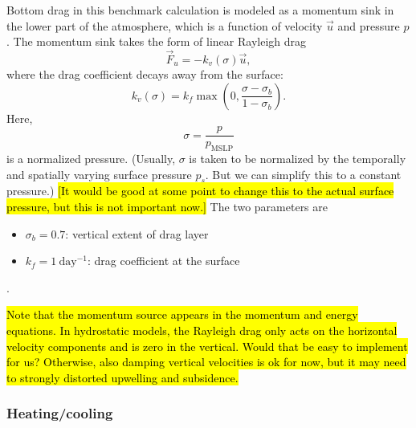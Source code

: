 \documentclass{report}
\begin{document}
{Bottom drag in this benchmark calculation is modeled as a momentum sink in the lower part of the atmosphere, which is a function of velocity $\vec{u}$ and pressure $p$. The momentum sink takes the form of linear Rayleigh drag
\begin{equation}
    \vec{F}_u = -k_v(\sigma) \vec{u},
\end{equation}
where the drag coefficient decays away from the surface:
\begin{equation}
    k_v(\sigma) = k_f \max \left( 0, \frac{\sigma - \sigma_b}{1-\sigma_b} \right).
\end{equation}
Here,
\[
\sigma = \frac{p}{p_{\mathrm{MSLP}}}
\]
is a normalized pressure. (Usually, $\sigma$ is taken to be normalized by the temporally and spatially varying surface pressure $p_s$. But we can simplify this to a constant pressure.) \hl{[It would be good at some point to change this to the actual surface pressure, but this is not important now.]} The two parameters are
\begin{itemize}
    \item $\sigma_b = 0.7$: vertical extent of drag layer
    \item $k_f = 1~\mathrm{day^{-1}}$: drag coefficient at the surface
\end{itemize}.

\hl{Note that the momentum source appears in the momentum and energy equations. In hydrostatic models, the Rayleigh drag only acts on the horizontal velocity components and is zero in the vertical. Would that be easy to implement for us? Otherwise, also damping vertical velocities is ok for now, but it may need to strongly distorted upwelling and subsidence.}

\subsubsection{Heating/cooling}

}
\end{document}
